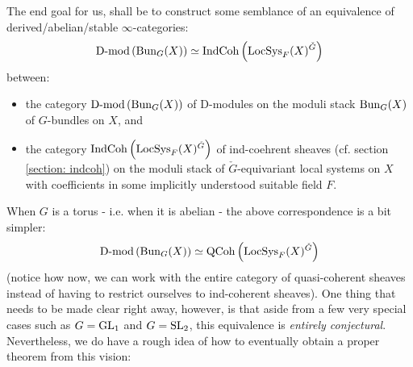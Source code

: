         The end goal for us, shall be to construct some semblance of an equivalence of derived/abelian/stable $\infty$-categories:
            $$\mathrm{D}\text{-}\mathrm{mod}\left(\mathrm{Bun}_G(X)\right) \simeq \mathrm{Ind}\mathrm{Coh}\left(\mathrm{LocSys}_F(X)^{\check{G}}\right)$$
        between:
            \begin{itemize}
                \item the category $\mathrm{D}\text{-}\mathrm{mod}\left(\mathrm{Bun}_G(X)\right)$ of D-modules on the moduli stack $\mathrm{Bun}_G(X)$ of $G$-bundles on $X$, and
                \item the category $\mathrm{Ind}\mathrm{Coh}\left(\mathrm{LocSys}_F(X)^{\check{G}}\right)$ of ind-coehrent sheaves (cf. section \ref{section: indcoh}) on the moduli stack of $\check{G}$-equivariant local systems on $X$ with coefficients in some implicitly understood suitable field $F$. 
            \end{itemize}
        When $G$ is a torus - i.e. when it is abelian - the above correspondence is a bit simpler:
            $$\mathrm{D}\text{-}\mathrm{mod}\left(\mathrm{Bun}_G(X)\right) \simeq \mathrm{QCoh}\left(\mathrm{LocSys}_F(X)^{\check{G}}\right)$$
        (notice how now, we can work with the entire category of quasi-coherent sheaves instead of having to restrict ourselves to ind-coherent sheaves). One thing that needs to be made clear right away, however, is that aside from a few very special cases such as $G = \operatorname{GL}_1$ and $G = \operatorname{SL}_2$, this equivalence is \textit{entirely conjectural}. Nevertheless, we do have a rough idea of how to eventually obtain a proper theorem from this vision:
